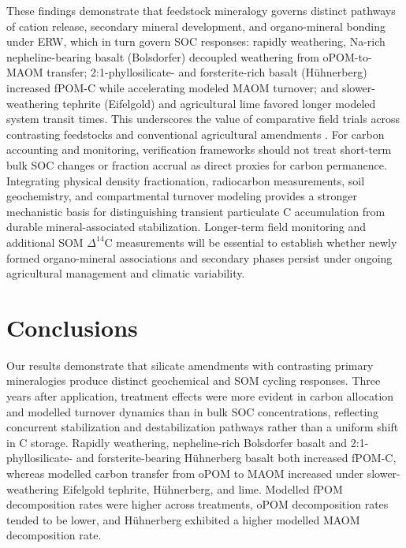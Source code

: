 \documentclass[preprint,12pt]{elsarticle}
\begin{document}
These findings demonstrate that feedstock mineralogy governs distinct pathways of cation release, secondary mineral development, and organo-mineral bonding under ERW, which in turn govern SOC responses: rapidly weathering, Na-rich nepheline-bearing basalt (Bolsdorfer) decoupled weathering from oPOM-to-MAOM transfer; 2:1-phyllosilicate- and forsterite-rich basalt (H\"uhnerberg) increased fPOM-C while accelerating modeled MAOM turnover; and slower-weathering tephrite (Eifelgold) and agricultural lime favored longer modeled system transit times. This underscores the value of comparative field trials across contrasting feedstocks and conventional agricultural amendments \citep{steinwidder2025beyond,tePas2023,Araujo2024,Buckingham2024}.
For carbon accounting and monitoring, verification frameworks should not treat short-term bulk SOC changes or fraction accrual as direct proxies for carbon permanence. Integrating physical density fractionation, radiocarbon measurements, soil geochemistry, and compartmental turnover modeling provides a stronger mechanistic basis for distinguishing transient particulate C accumulation from durable mineral-associated stabilization. Longer-term field monitoring and additional SOM $\Delta^{14}$C measurements will be essential to establish whether newly formed organo-mineral associations and secondary phases persist under ongoing agricultural management and climatic variability.
  

\section{Conclusions}
\label{sec:conclusions}

Our results demonstrate that silicate amendments with contrasting primary mineralogies produce distinct geochemical and SOM cycling responses. Three years after application, treatment effects were more evident in carbon allocation and modelled turnover dynamics than in bulk SOC concentrations, reflecting concurrent stabilization and destabilization pathways rather than a uniform shift in C storage. Rapidly weathering, nepheline-rich Bolsdorfer basalt and 2:1-phyllosilicate- and forsterite-bearing H\"uhnerberg basalt both increased fPOM-C, whereas modelled carbon transfer from oPOM to MAOM increased under slower-weathering Eifelgold tephrite, H\"uhnerberg, and lime. Modelled fPOM decomposition rates were higher across treatments, oPOM decomposition rates tended to be lower, and H\"uhnerberg exhibited a higher modelled MAOM decomposition rate.
\end{document}

